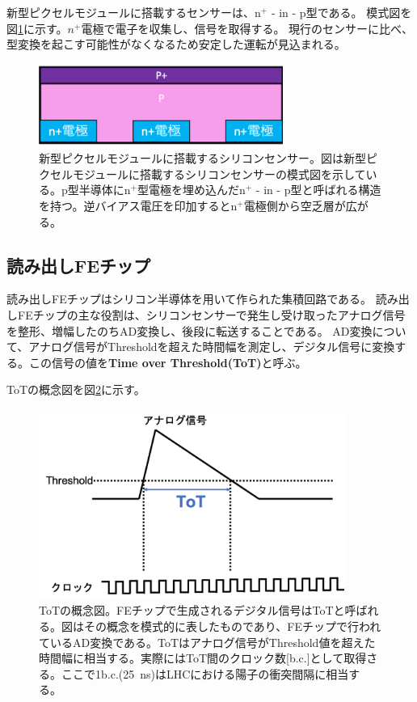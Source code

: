 新型ピクセルモジュールに搭載するセンサーは、n${}^+$ - in - p型である。
模式図を図\ref{sensor_image}に示す。$n^+$電極で電子を収集し、信号を取得する。
現行のセンサーに比べ、型変換を起こす可能性がなくなるため安定した運転が見込まれる\cite{1-3}。

\begin{figure}[bpt]\centering
\includegraphics[width=8cm]{sensor_image}
\caption[新型ピクセルモジュールに搭載するシリコンセンサー]{新型ピクセルモジュールに搭載するシリコンセンサー。図は新型ピクセルモジュールに搭載するシリコンセンサーの模式図を示している。p型半導体にn${}^+$型電極を埋め込んだn${}^+$ - in - p型と呼ばれる構造を持つ。逆バイアス電圧を印加するとn${}^+$電極側から空乏層が広がる。}
\label{sensor_image}
\end{figure}

\subsection{読み出しFEチップ}
読み出しFEチップはシリコン半導体を用いて作られた集積回路である。
読み出しFEチップの主な役割は、シリコンセンサーで発生し受け取ったアナログ信号を整形、増幅したのちAD変換し、後段に転送することである。
AD変換について、アナログ信号がThresholdを超えた時間幅を測定し、デジタル信号に変換する。この信号の値を\textbf{Time over Threshold(ToT)}と呼ぶ。

ToTの概念図を図\ref{tot_algorithm}に示す。

\begin{figure}[bpt]\centering
\includegraphics[width=10cm]{tot_algorithm}
\caption[ToTの概念図]{ToTの概念図。FEチップで生成されるデジタル信号はToTと呼ばれる。図はその概念を模式的に表したものであり、FEチップで行われているAD変換である。ToTはアナログ信号がThreshold値を超えた時間幅に相当する。実際にはToT間のクロック数[b.c.]として取得さる。ここで1b.c.(25~ns)はLHCにおける陽子の衝突間隔に相当する。}
\label{tot_algorithm}
\end{figure}

